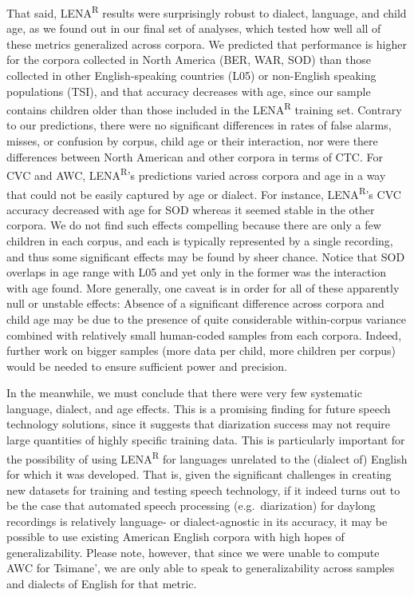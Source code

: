 \documentclass[english,table,man,floatsintext]{apa6}
\begin{document}
That said, LENA\textsuperscript{R} results were surprisingly robust to dialect, language, and child age, as we found out in our final set of analyses, which tested how well all of these metrics generalized across corpora. We predicted that performance is higher for the corpora collected in North America (BER, WAR, SOD) than those collected in other English-speaking countries (L05) or non-English speaking populations (TSI), and that accuracy decreases with age, since our sample contains children older than those included in the LENA\textsuperscript{R} training set. Contrary to our predictions, there were no significant differences in rates of false alarms, misses, or confusion by corpus, child age or their interaction, nor were there differences between North American and other corpora in terms of CTC. For CVC and AWC, LENA\textsuperscript{R}'s predictions varied across corpora and age in a way that could not be easily captured by age or dialect. For instance, LENA\textsuperscript{R}'s CVC accuracy decreased with age for SOD whereas it seemed stable in the other corpora. We do not find such effects compelling because there are only a few children in each corpus, and each is typically represented by a single recording, and thus some significant effects may be found by sheer chance. Notice that SOD overlaps in age range with L05 and yet only in the former was the interaction with age found. More generally, one caveat is in order for all of these apparently null or unstable effects: Absence of a significant difference across corpora and child age may be due to the presence of quite considerable within-corpus variance combined with relatively small human-coded samples from each corpora. Indeed, further work on bigger samples (more data per child, more children per corpus) would be needed to ensure sufficient power and precision.

In the meanwhile, we must conclude that there were very few systematic language, dialect, and age effects. This is a promising finding for future speech technology solutions, since it suggests that diarization success may not require large quantities of highly specific training data. This is particularly important for the possibility of using LENA\textsuperscript{R} for languages unrelated to the (dialect of) English for which it was developed. That is, given the significant challenges in creating new datasets for training and testing speech technology, if it indeed turns out to be the case that automated speech processing (e.g.~diarization) for daylong recordings is relatively language- or dialect-agnostic in its accuracy, it may be possible to use existing American English corpora with high hopes of generalizability. Please note, however, that since we were unable to compute AWC for Tsimane', we are only able to speak to generalizability across samples and dialects of English for that metric.
\end{document}
